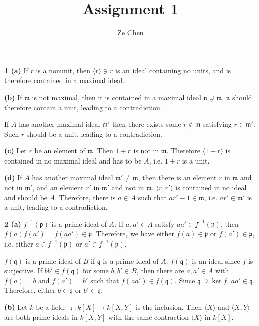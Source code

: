 \documentclass{article}
\title{Assignment 1}
\author{Ze Chen}
\makeatletter
\newcommand*{\shifttext}[1]{%
  \settowidth{\@tempdima}{#1}%
  \hspace{-\@tempdima}#1%
}
\newcommand{\plabel}[1]{%
\shifttext{\textbf{#1}\quad}%
}
\makeatother
\begin{document}
\maketitle

\plabel{1 (a)}%
If $r$ is a nonunit, then $\langle r \rangle \ni r$ is an ideal containing no units, and is therefore contained in a maximal ideal.

\plabel{(b)}%
If $\mathfrak{m}$ is not maximal, then it is contained in a maximal ideal $\mathfrak{n} \supsetneq \mathfrak{m}$.
$\mathfrak{n}$ should therefore contain a unit, leading to a contradiction.
\par
If $A$ has another maximal ideal $\mathfrak{m}'$ then there exists some $r\notin \mathfrak{m}$ satisfying $r\in \mathfrak{m}'$.
Such $r$ should be a unit, leading to a contradiction.

\plabel{(c)}%
Let $r$ be an element of $\mathfrak{m}$.
Then $1+r$ is not in $\mathfrak{m}$.
Therefore $\langle 1+r \rangle$ is contained in no maximal ideal and has to be $A$, i.e. $1+r$ is a unit.

\plabel{(d)}%
If $A$ has another maximal ideal $\mathfrak{m}' \neq \mathfrak{m}$, then there is an element $r$ in $\mathfrak{m}$ and not in $\mathfrak{m}'$, and an element $r'$ in $\mathfrak{m}'$ and not in $\mathfrak{m}$.
$\langle r,r' \rangle$ is contained in no ideal and should be $A$.
Therefore, there is $a\in A$ such that $ar' - 1 \in \mathfrak{m}$, i.e. $ar'\in \mathfrak{m}'$ is a unit, leading to a contradiction.

\plabel{2 (a)}%
$f^{-1}(\mathfrak{p})$ is a prime ideal of $A$: If $a,a'\in A$ satisfy $a a' \in f^{-1}(\mathfrak{p})$, then $f(a) f(a') = f(aa') \in \mathfrak{p}$.
Therefore, we have either $f(a) \in \mathfrak{p}$ or $f(a')\in \mathfrak{p}$, i.e. either $a\in f^{-1}(\mathfrak{p})$ or $a' \in f^{-1}(\mathfrak{p})$.
\par
$f(\mathfrak{q})$ is a prime ideal of $B$ if $\mathfrak{q}$ is a prime ideal of $A$: $f(\mathfrak{q})$ is an ideal since $f$ is surjective.
If $bb'\in f(\mathfrak{q})$ for some $b,b'\in B$, then there are $a,a'\in A$ with $f(a) = b$ and $f(a') = b'$ such that $f(aa')\in f(\mathfrak{q})$.
Since $\mathfrak{q} \supseteq \ker f$, $aa' \in \mathfrak{q}$.
Therefore, either $b\in \mathfrak{q}$ or $b'\in \mathfrak{q}$.

\plabel{(b)}%
Let $k$ be a field.
$\imath: k[X] \rightarrow k[X,Y]$ is the inclusion.
Then $\langle X\rangle$ and $\langle X,Y \rangle$ are both prime ideals in $k[X,Y]$ with the same contraction $\langle X \rangle$ in $k[X]$.
\end{document}
